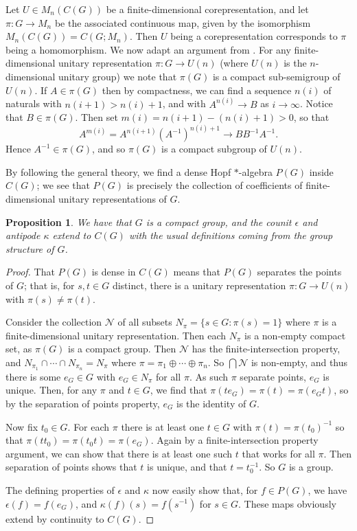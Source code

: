 \documentclass[twoside,a4paper,12pt]{article}
\theoremstyle{plain}
\newtheorem{proposition}{Proposition}[section]
\theoremstyle{definition}
\newcommand{\mc}{\mathcal}
\begin{document}
Let $U\in M_n(C(G))$ be a finite-dimensional corepresentation, and let
$\pi:G\rightarrow M_n$ be the associated continuous map, given by the
isomorphism $M_n(C(G)) = C(G;M_n)$.  Then $U$ being a corepresentation
corresponds to $\pi$ being a homomorphism.
We now adapt an argument from \cite{woro3}.  For any finite-dimensional unitary
representation $\pi:G\rightarrow U(n)$ (where $U(n)$ is the $n$-dimensional
unitary group) we note that $\pi(G)$ is a compact sub-semigroup of $U(n)$.
If $A\in \pi(G)$ then by compactness, we can find a sequence $n(i)$ of naturals
with $n(i+1)>n(i)+1$, and with $A^{n(i)} \rightarrow B$ as $i\rightarrow\infty$.
Notice that $B\in\pi(G)$.  Then set $m(i) = n(i+1)-(n(i)+1)>0$, so that
\[ A^{m(i)} = A^{n(i+1)} (A^{-1})^{n(i)+1} \rightarrow B B^{-1} A^{-1}. \]
Hence $A^{-1}\in\pi(G)$, and so $\pi(G)$ is a compact subgroup of $U(n)$.

By following the general theory, we find a dense Hopf $*$-algebra $P(G)$ inside
$C(G)$; we see that $P(G)$ is precisely the collection of coefficients of
finite-dimensional unitary representations of $G$.

\begin{proposition}
We have that $G$ is a compact group, and the counit $\epsilon$ and antipode
$\kappa$ extend to $C(G)$ with the usual definitions coming from the group
structure of $G$.
\end{proposition}
\begin{proof}
That $P(G)$ is dense in $C(G)$ means that $P(G)$ separates the points of $G$;
that is, for $s,t\in G$ distinct, there is a unitary representation
$\pi:G\rightarrow U(n)$ with $\pi(s)\not=\pi(t)$.  

Consider the collection $\mc N$ of all subsets $N_\pi=\{ s\in G:
\pi(s)=1 \}$ where $\pi$ is a finite-dimensional unitary representation.
Then each $N_\pi$ is a non-empty compact set, as $\pi(G)$ is a compact group.
Then $\mc N$ has the finite-intersection property, and $N_{\pi_1}
\cap\cdots\cap N_{\pi_n} = N_\pi$ where $\pi=\pi_1\oplus\cdots\oplus\pi_n$.
So $\bigcap\mc N$ is non-empty, and thus there is some $e_G\in G$ with
$e_G\in N_\pi$ for all $\pi$.  As such $\pi$ separate points, $e_G$ is unique.
Then, for any $\pi$ and $t\in G$, we find that $\pi(te_G) = \pi(t) = \pi(e_Gt)$,
so by the separation of points property, $e_G$ is the identity of $G$.

Now fix $t_0\in G$.  For each $\pi$ there is at least one $t\in G$ with
$\pi(t)=\pi(t_0)^{-1}$ so that $\pi(tt_0) = \pi(t_0t) = \pi(e_G)$.  Again by
a finite-intersection property argument, we can show that there is at least one
such $t$ that works for all $\pi$.  Then separation of points shows that $t$ is
unique, and that $t=t_0^{-1}$.  So $G$ is a group.

The defining properties of $\epsilon$ and $\kappa$ now easily show that, for
$f\in P(G)$, we have $\epsilon(f) = f(e_G)$, and $\kappa(f)(s) = f(s^{-1})$
for $s\in G$.  These maps obviously extend by continuity to $C(G)$.
\end{proof}
\end{document}
